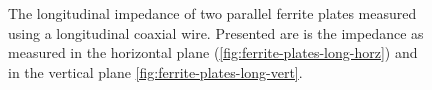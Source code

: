 \begin{figure}
\label{fig:ferrite-plates-long}
\caption{The longitudinal impedance of two parallel ferrite plates measured using a longitudinal coaxial wire. Presented are is the impedance as measured in the horizontal plane (\ref{fig:ferrite-plates-long-horz}) and in the vertical plane \ref{fig:ferrite-plates-long-vert}.}
\end{figure}

